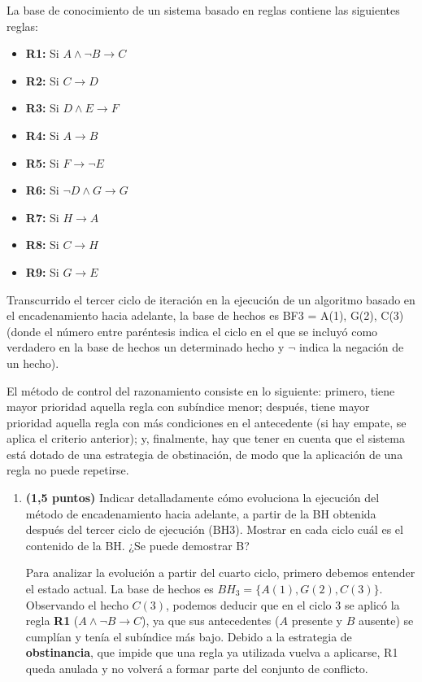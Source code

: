 \documentclass[11pt, a4paper]{article}
\newenvironment{problem}[1][Cuestión]{
	\vspace{0.5cm}
	\noindent{\Large\bfseries #1} \par\vspace{0.5cm}
}{
	\vspace{0.5cm}
}
\begin{document}
	\begin{problem}[Problema 2 (30 \%)]
		La base de conocimiento de un sistema basado en reglas contiene las siguientes reglas:

		\begin{itemize}
			\item \textbf{R1:} Si $A \wedge \neg B \rightarrow C$
			\item \textbf{R2:} Si $C \rightarrow D$
			\item \textbf{R3:} Si $D \wedge E \rightarrow F$
			\item \textbf{R4:} Si $A \rightarrow B$
			\item \textbf{R5:} Si $F \rightarrow \neg E$
			\item \textbf{R6:} Si $\neg D \wedge G \rightarrow G$
			\item \textbf{R7:} Si $H \rightarrow A$
			\item \textbf{R8:} Si $C \rightarrow H$
			\item \textbf{R9:} Si $G \rightarrow E$
		\end{itemize}

		Transcurrido el tercer ciclo de iteración en la ejecución de un algoritmo basado en el encadenamiento hacia adelante, la base de hechos es BF3 = { A(1), G(2), C(3) } (donde el número entre paréntesis indica el ciclo en el que se incluyó como verdadero en la base de hechos un determinado hecho y $\neg$ indica la negación de un hecho).

		El método de control del razonamiento consiste en lo siguiente: primero, tiene mayor prioridad aquella regla con subíndice menor; después, tiene mayor prioridad aquella regla con más condiciones en el antecedente (si hay empate, se aplica el criterio anterior); y, finalmente, hay que tener en cuenta que el sistema está dotado de una estrategia de obstinación, de modo que la aplicación de una regla no puede repetirse.

		\begin{enumerate}[label=\alph*)]
			\item \textbf{(1,5 puntos)} Indicar detalladamente cómo evoluciona la ejecución del método de encadenamiento hacia adelante, a partir de la BH obtenida después del tercer ciclo de ejecución (BH3). Mostrar en cada ciclo cuál es el contenido de la BH. ¿Se puede demostrar B?

			{ \color{blue} 
				Para analizar la evolución a partir del cuarto ciclo, primero debemos entender el estado actual. La base de hechos es $BH_3 = \{ A(1), G(2), C(3) \}$. Observando el hecho $C(3)$, podemos deducir que en el ciclo 3 se aplicó la regla \textbf{R1} ($A \wedge \neg B \rightarrow C$), ya que sus antecedentes ($A$ presente y $B$ ausente) se cumplían y tenía el subíndice más bajo. Debido a la estrategia de \textbf{obstinancia}, que impide que una regla ya utilizada vuelva a aplicarse, R1 queda anulada y no volverá a formar parte del conjunto de conflicto.

}
\end{enumerate}
\end{problem}
\end{document}
